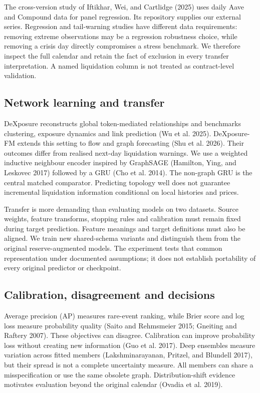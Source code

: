 \documentclass[
  10pt,
  a4paper,
]{article}
\begin{document}
The cross-version study of Iftikhar, Wei, and Cartlidge (2025) uses
daily Aave and Compound data for panel regression. Its repository
supplies our external series. Regression and tail-warning studies have
different data requirements: removing extreme observations may be a
regression robustness choice, while removing a crisis day directly
compromises a stress benchmark. We therefore inspect the full calendar
and retain the fact of exclusion in every transfer interpretation. A
named liquidation column is not treated as contract-level validation.

\subsection{Network learning and
transfer}\label{network-learning-and-transfer}

DeXposure reconstructs global token-mediated relationships and
benchmarks clustering, exposure dynamics and link prediction (Wu et al.
2025). DeXposure-FM extends this setting to flow and graph forecasting
(Shu et al. 2026). Their outcomes differ from realised next-day
liquidation warnings. We use a weighted inductive neighbour encoder
inspired by GraphSAGE (Hamilton, Ying, and Leskovec 2017) followed by a
GRU (Cho et al. 2014). The non-graph GRU is the central matched
comparator. Predicting topology well does not guarantee incremental
liquidation information conditional on local histories and prices.

Transfer is more demanding than evaluating models on two datasets.
Source weights, feature transforms, stopping rules and calibration must
remain fixed during target prediction. Feature meanings and target
definitions must also be aligned. We train new shared-schema variants
and distinguish them from the original reserve-augmented models. The
experiment tests that common representation under documented
assumptions; it does not establish portability of every original
predictor or checkpoint.

\subsection{Calibration, disagreement and
decisions}\label{calibration-disagreement-and-decisions}

Average precision (AP) measures rare-event ranking, while Brier score
and log loss measure probability quality (Saito and Rehmsmeier 2015;
Gneiting and Raftery 2007). These objectives can disagree. Calibration
can improve probability loss without creating new information (Guo et
al. 2017). Deep ensembles measure variation across fitted members
(Lakshminarayanan, Pritzel, and Blundell 2017), but their spread is not
a complete uncertainty measure. All members can share a misspecification
or use the same obsolete graph. Distribution-shift evidence motivates
evaluation beyond the original calendar (Ovadia et al. 2019).
\end{document}
